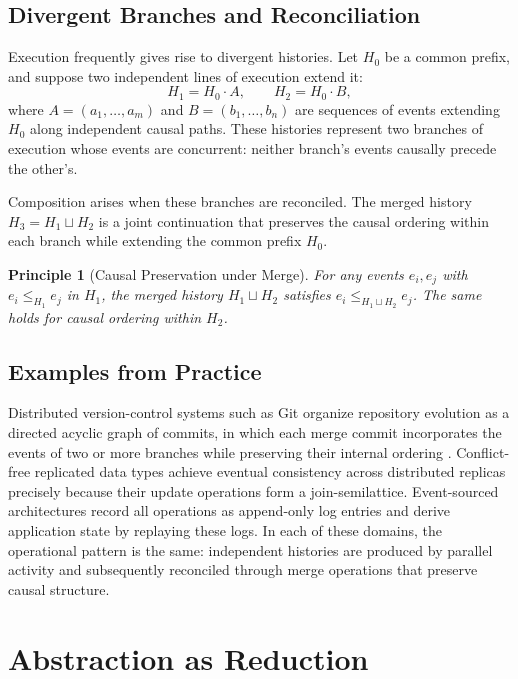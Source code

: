 \documentclass[12pt]{article}
\newtheorem{principle}{Principle}
\begin{document}
\subsection{Divergent Branches and Reconciliation}

Execution frequently gives rise to divergent histories. Let $H_0$ be a common prefix, and
suppose two independent lines of execution extend it:
\[
H_1 = H_0 \cdot A, \qquad H_2 = H_0 \cdot B,
\]
where $A = (a_1, \ldots, a_m)$ and $B = (b_1, \ldots, b_n)$ are sequences of events extending
$H_0$ along independent causal paths. These histories represent two branches of execution whose
events are concurrent: neither branch's events causally precede the other's.

Composition arises when these branches are reconciled. The merged history $H_3 = H_1 \sqcup H_2$
is a joint continuation that preserves the causal ordering within each branch while extending
the common prefix $H_0$.

\begin{principle}[Causal Preservation under Merge]
For any events $e_i, e_j$ with $e_i \leq_{H_1} e_j$ in $H_1$, the merged history
$H_1 \sqcup H_2$ satisfies $e_i \leq_{H_1 \sqcup H_2} e_j$. The same holds for causal
ordering within $H_2$.
\end{principle}

\subsection{Examples from Practice}

Distributed version-control systems such as Git organize repository evolution as a directed
acyclic graph of commits, in which each merge commit incorporates the events of two or more
branches while preserving their internal ordering \cite{chacon2014}. Conflict-free replicated
data types \cite{shapiro2011} achieve eventual consistency across distributed replicas precisely
because their update operations form a join-semilattice. Event-sourced architectures
\cite{fowler2005} record all operations as append-only log entries and derive application state
by replaying these logs. In each of these domains, the operational pattern is the same:
independent histories are produced by parallel activity and subsequently reconciled through
merge operations that preserve causal structure.

\section{Abstraction as Reduction}
\label{sec:abstraction}
\end{document}
